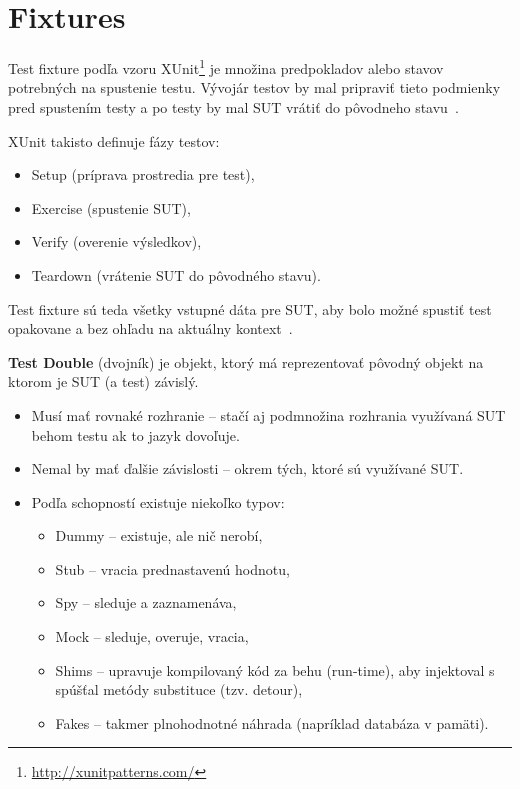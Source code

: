 \section{Fixtures}
\label{fixtures}
Test fixture podľa vzoru XUnit\footnote{\url{http://xunitpatterns.com/}} je množina predpokladov alebo stavov potrebných na spustenie testu. Vývojár testov by mal pripraviť tieto podmienky pred spustením testy a po testy by mal SUT vrátiť do pôvodneho stavu~\cite{Beck}.

XUnit takisto definuje fázy testov:
\begin{itemize}
	\item Setup (príprava prostredia pre test),
	\item Exercise (spustenie SUT),
	\item Verify (overenie výsledkov),
	\item Teardown (vrátenie SUT do pôvodného stavu).
\end{itemize}
Test fixture sú teda všetky vstupné dáta pre SUT, aby bolo možné spustiť test opakovane a bez ohľadu na aktuálny kontext~\cite{Smrcka}.

\textbf{Test Double} (dvojník) je objekt, ktorý má reprezentovať pôvodný objekt na ktorom je SUT (a test) závislý.
\begin{itemize}
	\item Musí mať rovnaké rozhranie -- stačí aj podmnožina rozhrania využívaná SUT behom testu ak to jazyk dovoľuje.
	\item Nemal by mať ďalšie závislosti -- okrem tých, ktoré sú využívané SUT.
	\item Podľa schopností existuje niekoľko typov:
		\begin{itemize}
			\item Dummy -- existuje, ale nič nerobí,
			\item Stub -- vracia prednastavenú hodnotu,
			\item Spy -- sleduje a zaznamenáva,
			\item Mock -- sleduje, overuje, vracia,
			\item Shims -- upravuje kompilovaný kód za behu (run-time), aby injektoval s spúšťal metódy substituce (tzv. detour),
			\item Fakes -- takmer plnohodnotné náhrada (napríklad databáza v pamäti).
		\end{itemize}
\end{itemize}

